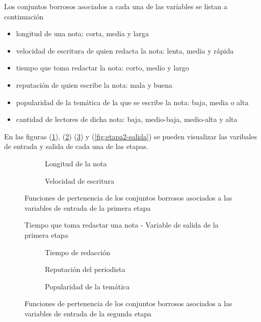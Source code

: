 \documentclass{article}
\begin{document}
\vspace{3mm}
Los conjuntos borrosos asociados a cada una de las variables se listan a continuación

\begin{itemize}
	\setlength\itemsep{0.001em} %
	\item longitud de una nota: corta, media y larga
	\item velocidad de escritura de quien redacta la nota: lenta, media y rápida
	\item tiempo que toma redactar la nota: corto, medio y largo
	\item reputación de quien escribe la nota: mala y buena
	\item popularidad de la temática de la que se escribe la nota: baja, media o alta
	\item cantidad de lectores de dicha nota: baja, medio-baja, medio-alta y alta
\end{itemize}

En las figuras (\ref{fig:etapa1-entrada}), (\ref{fig:etapa1-salida}) (\ref{fig:etapa2-entrada}) y (\ref{fig:etapa2-salida}) se pueden visualizar las varibales de entrada y salida de cada una de las etapas.

\begin{figure}[H]
	\centering
	\begin{subfigure}[b]{0.4\textwidth}
		\centering
		\caption{Longitud de la nota}
	\end{subfigure}
	\qquad
	\begin{subfigure}[b]{0.4\textwidth}
		\centering
		\caption{Velocidad de escritura}
	\end{subfigure}
	\caption{Funciones de pertenencia de los conjuntos borrosos asociados a las variables de entrada de la primera etapa}
	\label{fig:etapa1-entrada}
\end{figure}

\begin{figure}[H]
	\centering
	\caption{Tiempo que toma redactar una nota - Variable de salida de la primera etapa}
	\label{fig:etapa1-salida}
\end{figure}

\begin{figure}[H]
	\centering
	\begin{subfigure}[b]{0.3\textwidth}
		\centering
		\caption{Tiempo de redacción}
	\end{subfigure}
	\hfill
	\begin{subfigure}[b]{0.3\textwidth}
		\centering
		\caption{Reputación del periodista}
	\end{subfigure}
	\hfill
	\begin{subfigure}[b]{0.3\textwidth}
		\centering
		\caption{Popularidad de la temática}
	\end{subfigure}
	\caption{Funciones de pertenencia de los conjuntos borrosos asociados a las variables de entrada de la segunda etapa}
	\label{fig:etapa2-entrada}
\end{figure}
\end{document}
